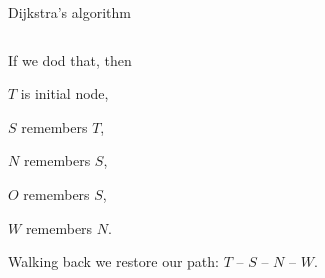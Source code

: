 \documentclass[9pt,aspectratio=169]{beamer}
\begin{document}
\begin{frame}{Dijkstra's algorithm}
\begin{columns}[T]
\begin{column}{0.5\textwidth}
      If we dod that, then 
      
      $T$ is initial node,

      $S$ remembers $T$, 
      
      $N$ remembers $S$, 
      
      $O$ remembers $S$, 
      
      $W$ remembers $N$.

      Walking back we restore our path: $T$ -- $S$ -- $N$ -- $W$.
    \end{column}
  \end{columns}
\end{frame}
\end{document}
